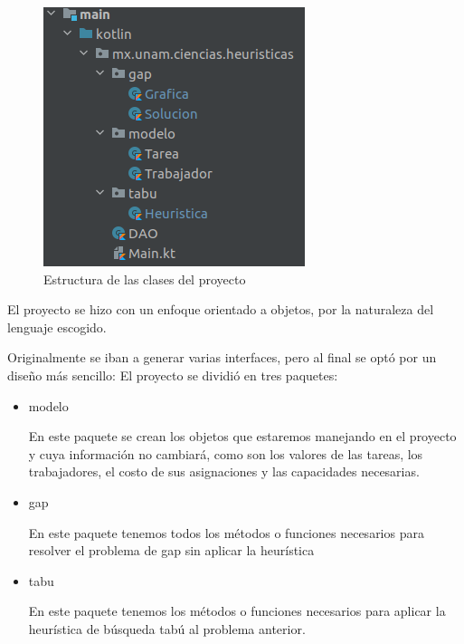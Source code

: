 \documentclass{article}
\begin{document}
\begin{figure}[H]
	\centering
	\includegraphics[scale=0.8]{imgs/estructura.png}
	\caption{Estructura de las clases del proyecto}
\end{figure}

El proyecto se hizo con un enfoque orientado a objetos, por la naturaleza del lenguaje escogido. 

Originalmente se iban a generar varias interfaces, pero al final se optó por un diseño más sencillo: El proyecto se dividió en tres paquetes: 
\begin{itemize}
	\item modelo
	
	En este paquete se crean los objetos que estaremos manejando en el proyecto y cuya información no cambiará, como son los valores de las tareas, los trabajadores, el costo de sus asignaciones y las capacidades necesarias.
	
	\item gap
	
	En este paquete tenemos todos los métodos o funciones necesarios para resolver el problema de gap sin aplicar la heurística
	
	\item tabu
	
	En este paquete tenemos los métodos o funciones necesarios para aplicar la heurística de búsqueda tabú al problema anterior.
\end{itemize}
\end{document}
